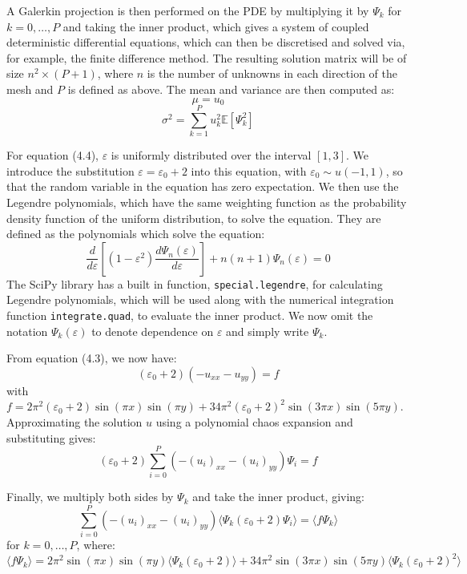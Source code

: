 \documentclass[11pt]{article}
\numberwithin{equation}{section}
\begin{document}
A Galerkin projection is then performed on the PDE by multiplying it by $\Psi_k$ for $k=0, \dots, P$ and taking the inner product, which gives a system of coupled deterministic differential equations, which can then be discretised and solved via, for example, the finite difference method. The resulting solution matrix will be of size $n^2 \times (P+1)$, where $n$ is the number of unknowns in each direction of the mesh and $P$ is defined as above. The mean and variance are then computed as:
\begin{equation}
\mu = u_0
\end{equation}
\begin{equation}
\sigma^2 = \sum_{k=1}^P u_k^2 \mathbb{E}[\Psi_k^2]
\end{equation}

For equation (4.4), $\varepsilon$ is uniformly distributed over the interval $[1,3]$. We introduce the substitution $\varepsilon = \varepsilon_0 + 2$ into this equation, with $\varepsilon_0 \sim u(-1,1)$, so that the random variable in the equation has zero expectation. We then use the Legendre polynomials, which have the same weighting function as the probability density function of the uniform distribution, to solve the equation. They are defined as the polynomials which solve the equation:
\begin{equation}
\frac{d}{d\varepsilon} \left[ (1-\varepsilon^2) \frac{d\Psi_n(\varepsilon)}{d\varepsilon} \right] + n(n+1) \Psi_n(\varepsilon) = 0 
\end{equation}
The SciPy library has a built in function, \texttt{special.legendre}, for calculating Legendre polynomials, which will be used along with the numerical integration function \texttt{integrate.quad}, to evaluate the inner product. We now omit the notation $\Psi_k (\varepsilon)$ to denote dependence on $\varepsilon$ and simply write $\Psi_k$.

From equation (4.3), we now have:
\begin{equation}
(\varepsilon_0+2)(- u_{xx} - u_{yy}) = f
\end{equation}
with $f = 2\pi^2 (\varepsilon_0 +2) \sin(\pi x) \sin(\pi y)+ 34 \pi^2 (\varepsilon_0 + 2)^2 \sin(3 \pi x) \sin(5 \pi y)$. Approximating the solution $u$ using a polynomial chaos expansion and substituting gives:
\begin{equation}
(\varepsilon_0 + 2) \sum_{i=0}^P (-(u_i)_{xx} -(u_i)_{yy}) \Psi_i = f
\end{equation}

Finally, we multiply both sides by $\Psi_k$ and take the inner product, giving:
\begin{equation}
\sum_{i=0}^P (-(u_i)_{xx} -(u_i)_{yy}) \langle \Psi_k (\varepsilon_0 + 2) \Psi_i \rangle = \langle f \Psi_k \rangle
\end{equation}
for $k = 0, \dots, P$, where:
\begin{equation}
\langle f \Psi_k \rangle = 2\pi^2 \sin(\pi x) \sin(\pi y) \langle \Psi_k (\varepsilon_0 + 2) \rangle
+ 34 \pi^2 \sin(3 \pi x) \sin(5 \pi y) \langle \Psi_k (\varepsilon_0 + 2)^2 \rangle
\end{equation}
\end{document}
